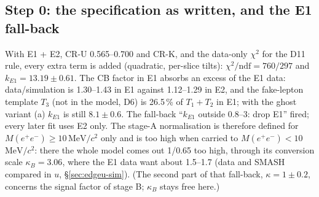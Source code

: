 \documentclass[11pt,a4paper]{article}
\newcommand{\Mee}{\ensuremath{M(e^{+}e^{-})}\xspace}
\newcommand{\MeVcc}{\ensuremath{\mathrm{MeV}/c^{2}}\xspace}
\newcommand{\kB}{\ensuremath{\kappa_B}\xspace}
\newcommand{\kEone}{\ensuremath{k_{E1}}\xspace}
\begin{document}
\subsection{Step 0: the specification as written, and the E1 fall-back}
\label{sec:step0}
With E1 + E2, CR-U 0.565--0.700 and CR-K, and the data-only $\chi^2$ for the D11 rule, every extra term is added (quadratic, per-slice
tilts): $\chi^2/\mathrm{ndf}=760/297$ and $\kEone=13.19\pm0.61$. The CB factor in E1 absorbs an excess of the E1 data: data/simulation
is 1.30--1.43 in E1 against 1.12--1.29 in E2, and the fake-lepton template $T_3$ (not in the model, D6) is 26.5\,\% of $T_1+T_2$ in E1;
with the ghost variant (a) \kEone is still $8.1\pm0.6$. The fall-back ``\kEone outside 0.8--3: drop E1'' fired; every later fit
uses E2 only. The stage-A normalisation is therefore defined for \Mee$\ge10$\,\MeVcc only and is too high when carried to \Mee$<10$\,\MeVcc:
there the whole model comes out 1/0.65 too high, through its conversion scale $\kB=3.06$, where the E1 data want about 1.5--1.7 (data and
SMASH compared in $u$, \S\ref{sec:edgeu-sim}). (The second part of that fall-back, $\kappa=1\pm0.2$, concerns the signal factor of stage B; \kB stays free here.)
\end{document}

